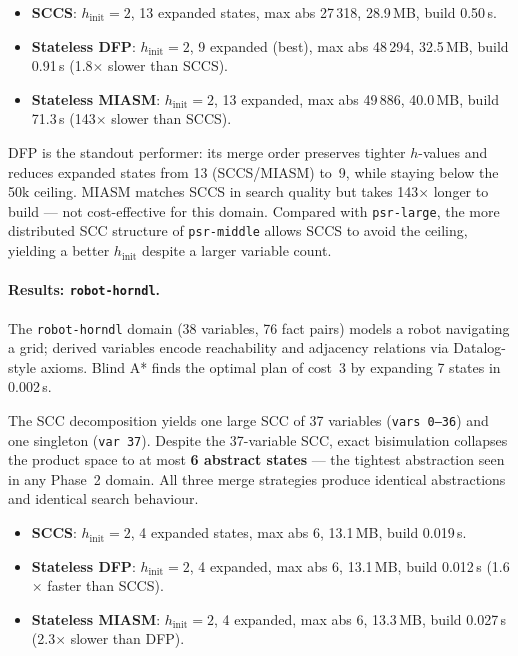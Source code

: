 \documentclass[11pt,a4paper]{article}
\begin{document}
    \begin{itemize}
      \item \textbf{SCCS}: $h_{\mathrm{init}} = 2$, 13 expanded states,
            max abs 27\,318, 28.9\,MB, build 0.50\,s.
      \item \textbf{Stateless DFP}: $h_{\mathrm{init}} = 2$, 9 expanded
            (best), max abs 48\,294, 32.5\,MB, build 0.91\,s
            (1.8$\times$ slower than SCCS).
      \item \textbf{Stateless MIASM}: $h_{\mathrm{init}} = 2$, 13 expanded,
            max abs 49\,886, 40.0\,MB, build 71.3\,s (143$\times$ slower
            than SCCS).
    \end{itemize}

    DFP is the standout performer: its merge order preserves tighter
    $h$-values and reduces expanded states from 13 (SCCS/MIASM) to~9,
    while staying below the 50k ceiling.  MIASM matches SCCS in search
    quality but takes 143$\times$ longer to build — not cost-effective
    for this domain.  Compared with \texttt{psr-large}, the more distributed
    SCC structure of \texttt{psr-middle} allows SCCS to avoid the ceiling,
    yielding a better $h_{\mathrm{init}}$ despite a larger variable count.

    \paragraph{Results: \texttt{robot-horndl}.}

    The \texttt{robot-horndl} domain (38 variables, 76 fact pairs) models a
    robot navigating a grid; derived variables encode reachability and
    adjacency relations via Datalog-style axioms.
    Blind A* finds the optimal plan of cost~3 by expanding 7 states in
    0.002\,s.

    The SCC decomposition yields one large SCC of 37 variables
    (\texttt{vars 0--36}) and one singleton (\texttt{var 37}).
    Despite the 37-variable SCC, exact bisimulation collapses the product
    space to at most \textbf{6 abstract states} — the tightest abstraction
    seen in any Phase~2 domain.  All three merge strategies produce
    identical abstractions and identical search behaviour.

    \begin{itemize}
      \item \textbf{SCCS}: $h_{\mathrm{init}} = 2$, 4 expanded states,
            max abs 6, 13.1\,MB, build 0.019\,s.
      \item \textbf{Stateless DFP}: $h_{\mathrm{init}} = 2$, 4 expanded,
            max abs 6, 13.1\,MB, build 0.012\,s (1.6$\times$ faster
            than SCCS).
      \item \textbf{Stateless MIASM}: $h_{\mathrm{init}} = 2$, 4 expanded,
            max abs 6, 13.3\,MB, build 0.027\,s (2.3$\times$ slower
            than DFP).
    \end{itemize}
\end{document}
